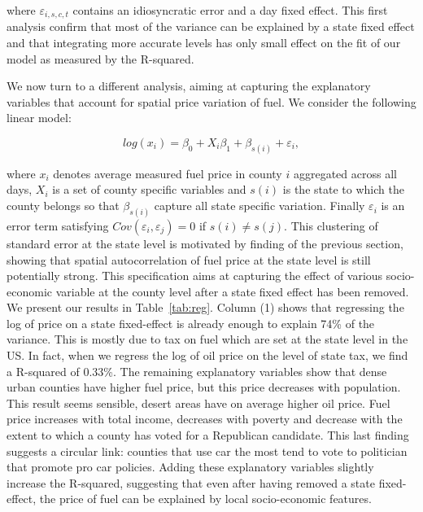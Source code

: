 \documentclass[3p,times,procedia]{elsarticle}
\begin{document}
where $\varepsilon_{i,s,c,t}$ contains an idiosyncratic error and a day fixed effect. This first analysis confirm that most of the variance can be explained by a state fixed effect and that integrating more accurate levels has only small effect on the fit of our model as measured by the R-squared.

We now turn to a different analysis, aiming at capturing the explanatory variables that account for spatial price variation of fuel. We consider the following linear model:

\begin{equation}
\label{eq:reg}
log(x_{i}) = \beta_0 + X_{i}\beta_1 + \beta_{s(i)} + \varepsilon_{i},
\end{equation}

where $x_{i}$ denotes average measured fuel price in county $i$ aggregated across all days, $X_{i}$ is a set of county specific variables and $s(i)$ is the state to which the county belongs so that $\beta_{s(i)}$ capture all state specific variation. Finally $\varepsilon_{i}$ is an error term satisfying $Cov(\varepsilon_{i}, \varepsilon_{j}) = 0$ if $s(i) \neq s(j)$. This clustering of standard error at the state level is motivated by finding of the previous section, showing that spatial autocorrelation of fuel price at the state level is still potentially strong. This specification aims at capturing the effect of various socio-economic variable at the county level after a state fixed effect has been removed. We present our results in Table~\ref{tab:reg}. Column (1) shows that regressing the log of price on a state fixed-effect is already enough to explain 74\% of the variance. This is mostly due to tax on fuel which are set at the state level in the US. In fact, when we regress the log of oil price on the level of state tax, we find a R-squared of 0.33\%. The remaining explanatory variables show that dense urban counties have higher fuel price, but this price decreases with population. This result seems sensible, desert areas have on average higher oil price. Fuel price increases with total income, decreases with poverty and decrease with the extent to which a county has voted for a Republican candidate. This last finding suggests a circular link: counties that use car the most tend to vote to politician that promote pro car policies.
Adding these explanatory variables slightly increase the R-squared, suggesting that even after having removed a state fixed-effect, the price of fuel can be explained by local socio-economic features.	
\end{document}

